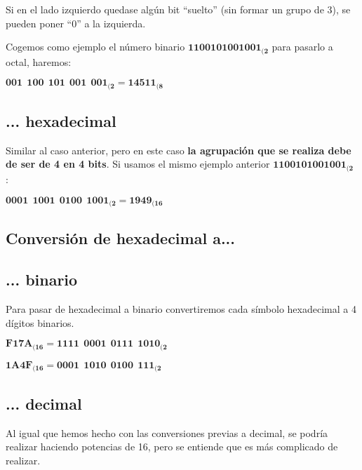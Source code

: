 Si en el lado izquierdo quedase algún bit “suelto” (sin formar un grupo de 3), se pueden poner “0” a la izquierda.

Cogemos como ejemplo el número binario $\mathbf{1100101001001_{(2}}$ para pasarlo a octal, haremos:

\begin{center}
    \vspace{-15pt}
    $\mathbf{001\ \ 100\ \ 101\ \ 001\ \ 001_{(2} = 14511_{(8}}$
    \vspace{-15pt}
\end{center}

\subsection*{... hexadecimal}
Similar al caso anterior, pero en este caso \textbf{la agrupación que se realiza debe de ser de 4 en 4 bits}. Si usamos el mismo ejemplo anterior $\mathbf{1100101001001_{(2}}$ :

\begin{center}
    \vspace{-15pt}
    $\mathbf{0001\ \ 1001\ \ 0100\ \ 1001_{(2} = 1949_{(16}}$
    \vspace{25pt}
\end{center}



\subsection{Conversión de hexadecimal a...}
\subsection*{... binario}
Para pasar de hexadecimal a binario convertiremos cada símbolo hexadecimal a 4 dígitos binarios.

\begin{center}
    \vspace{-15pt}
    $\mathbf{F17A_{(16} = 1111\ \ 0001\ \ 0111\ \ 1010_{(2}}$

    $\mathbf{1A4F_{(16} = 0001\ \ 1010\ \ 0100\ \ 111_{(2}}$
    \vspace{-15pt}
\end{center}


\subsection*{... decimal}
Al igual que hemos hecho con las conversiones previas a decimal, se podría realizar haciendo potencias de 16, pero se entiende que es más complicado de realizar.

